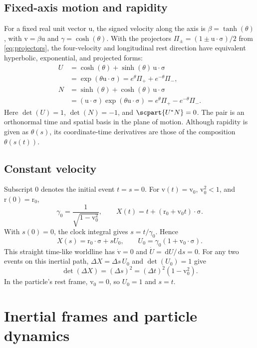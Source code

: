 \documentclass[11pt]{article}
\newcommand{\pv}[1]{{#1}}
\newcommand{\pvGreek}[1]{{#1}}
\newcommand{\vstyle}[1]{{\bm{\mathrm{#1}}}}
\newcommand{\pN}{\pv{N}}
\newcommand{\pU}{\pv{U}}
\newcommand{\pX}{\pv{X}}
\newcommand{\pvPi}{\pvGreek{\Pi}}
\numberwithin{equation}{section}
\newcommand{\dotprod}{\cdot}
\newcommand{\bsig}{\vstyle{\sigma}}
\newcommand{\br}{\vstyle{r}}
\newcommand{\bv}{\vstyle{v}}
\newcommand{\bu}{\vstyle{u}}
\newcommand{\dd}{\,\mathrm d}
\begin{document}
\subsection{Fixed-axis motion and rapidity}
\label{sec:fixed-axis}
For a fixed real unit vector $\bu$, the signed velocity along the axis
is $\beta=\tanh(\theta)$, with $\bv=\beta\bu$ and $\gamma=\cosh(\theta)$.
With the projectors $\pvPi_\pm=(1\pm\bu\dotprod\bsig)/2$
from \eqref{eq:projectors}, the four-velocity and longitudinal rest
direction have equivalent hyperbolic, exponential, and projected forms:
\begin{align*}
 \pU&=\cosh(\theta)+\sinh(\theta)\,\bu\dotprod\bsig\\
 &=\exp(\theta\bu\dotprod\bsig)
 =e^\theta\pvPi_++e^{-\theta}\pvPi_-,\\
 \pN&=\sinh(\theta)+\cosh(\theta)\,\bu\dotprod\bsig\\
 &=(\bu\dotprod\bsig)\exp(\theta\bu\dotprod\bsig)
 =e^\theta\pvPi_+-e^{-\theta}\pvPi_-.
\end{align*}
Here $\det(\pU)=1$, $\det(\pN)=-1$, and $\scpart{\pU^*\pN}=0$.
The pair is an orthonormal time and spatial basis in the plane of motion.
Although rapidity is given as $\theta(s)$, its coordinate-time derivatives
are those of the composition $\theta(s(t))$.

\subsection{Constant velocity}
\label{sec:constant-velocity}
Subscript $0$ denotes the initial event $t=s=0$.
For $\bv(t)=\bv_0$, $\bv_0^2<1$, and $\br(0)=\br_0$,
\[
 \gamma_0=\frac{1}{\sqrt{1-\bv_0^2}},\qquad
 \pX(t)=t+(\br_0+\bv_0t)\dotprod\bsig.
\]
With $s(0)=0$, the clock integral gives $s=t/\gamma_0$. Hence
\begin{equation}
 \pX(s)=\br_0\dotprod\bsig+s\pU_0,\qquad
 \pU_0=\gamma_0(1+\bv_0\dotprod\bsig).
 \label{eq:constant-velocity-worldline}
\end{equation}
This straight time-like worldline has $\dot{\bv}=0$ and
$\dot{\pU}=\dd\pU/\dd s=0$. For any two events on this
inertial path, $\Delta\pX=\Delta s\,\pU_0$ and $\det(\pU_0)=1$ give
\[
 \det(\Delta\pX)=(\Delta s)^2
 =(\Delta t)^2(1-\bv_0^2).
\]
In the particle's rest frame, $\bv_0=0$, so $\pU_0=1$ and $s=t$.

\section{Inertial frames and particle dynamics}
\label{sec:inertial-frames}
\end{document}
